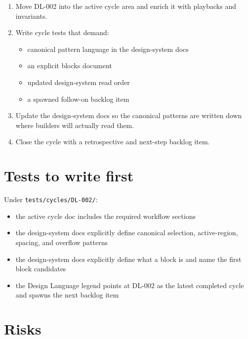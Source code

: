 \begin{enumerate}
\def\labelenumi{\arabic{enumi}.}
\tightlist
\item
  Move DL-002 into the active cycle area and enrich it with playbacks and invariants.
\item
  Write cycle tests that demand:

  \begin{itemize}
  \tightlist
  \item
    canonical pattern language in the design-system docs
  \item
    an explicit blocks document
  \item
    updated design-system read order
  \item
    a spawned follow-on backlog item
  \end{itemize}
\item
  Update the design-system docs so the canonical patterns are written down where builders will actually read them.
\item
  Close the cycle with a retrospective and next-step backlog item.
\end{enumerate}

\section{Tests to write first}\label{record-169-tests-to-write-first}

Under \texttt{t\allowbreak{}e\allowbreak{}s\allowbreak{}t\allowbreak{}s\allowbreak{}/\allowbreak{}c\allowbreak{}y\allowbreak{}c\allowbreak{}l\allowbreak{}e\allowbreak{}s\allowbreak{}/\allowbreak{}D\allowbreak{}L\allowbreak{}-\allowbreak{}0\allowbreak{}0\allowbreak{}2\allowbreak{}/}:

\begin{itemize}
\tightlist
\item
  the active cycle doc includes the required workflow sections
\item
  the design-system docs explicitly define canonical selection, active-region, spacing, and overflow patterns
\item
  the design-system docs explicitly define what a block is and name the first block candidates
\item
  the Design Language legend points at DL-002 as the latest completed cycle and spawns the next backlog item
\end{itemize}

\section{Risks}\label{record-169-risks}

